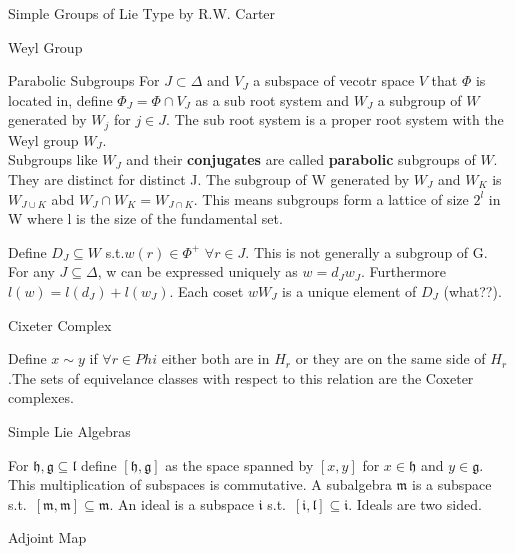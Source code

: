 \documentclass[12pt, letterpaper]{article}
\begin{document}
\begin{section}{Simple Groups of Lie Type by R.W. Carter}
\begin{subsection}{Weyl Group}
\begin{subsubsection}{Parabolic Subgroups}
      For \(J \subset \Delta\) and \(V_{J}\) a subspace of vecotr space \(V\)
      that \(\Phi\) is located in, define \(\Phi_{J} = \Phi \cap V_{J}\) as a
      sub root system and \(W_{J}\) a subgroup of \(W\) generated by \(W_{j}\)
      for \(j \in J\). The sub root system is a proper root system with the Weyl
      group \(W_{J}\). \\
      Subgroups like \(W_{J}\) and their \textbf{conjugates} are called
      \textbf{parabolic} subgroups of \(W\). They are distinct for distinct J.
      The subgroup of W generated by \(W_{J}\) and \(W_{K}\) is \(W_{J \cup K}\)
      abd \(W_{J} \cap W_{K} = W_{J \cap K}\). This means subgroups form a
      lattice of size \(2^{l}\) in W where l is the size of the fundamental set.

      Define \(D_{J} \subseteq W\) s.t.\(w(r) \in \Phi^{+}\)
      \(\forall r \in J\). This is not generally a subgroup of G. \\
      For any \(J \subseteq \Delta\), w can be expressed uniquely as
      \(w = d_{J}w_{J}\). Furthermore \(l(w) = l(d_{J}) + l(w_{J})\). Each coset
      \(wW_{J}\) is a unique element of \(D_{J}\) (what??).

    \end{subsubsection}

    \begin{subsubsection}{Cixeter Complex}

      Define \(x \sim y\) if \(\forall r \in Phi\) either both are in \(H_{r}\)
      or they are on the same side of \(H_{r}\).The sets of equivelance classes
      with respect to this relation are the Coxeter complexes.

    \end{subsubsection}

  \end{subsection}

  \begin{subsection}{Simple Lie Algebras}

    For \(\mathfrak{h}, \mathfrak{g} \subseteq \mathfrak{l}\) define
    \([\mathfrak{h}, \mathfrak{g}]\) as the space spanned by \([x, y]\) for
    \(x \in \mathfrak{h}\) and \(y \in \mathfrak{g}\). This multiplication of
    subspaces is commutative. A subalgebra \(\mathfrak{m}\) is a subspace s.t.\
    \([\mathfrak{m}, \mathfrak{m}] \subseteq \mathfrak{m}\). An ideal is a
    subspace \(\mathfrak{i}\) s.t.\ \([\mathfrak{i}, \mathfrak{l}] \subseteq
    \mathfrak{i}\). Ideals are two sided.

    \begin{subsubsection}{Adjoint Map}


\end{subsubsection}
\end{subsection}
\end{section}
\end{document}
